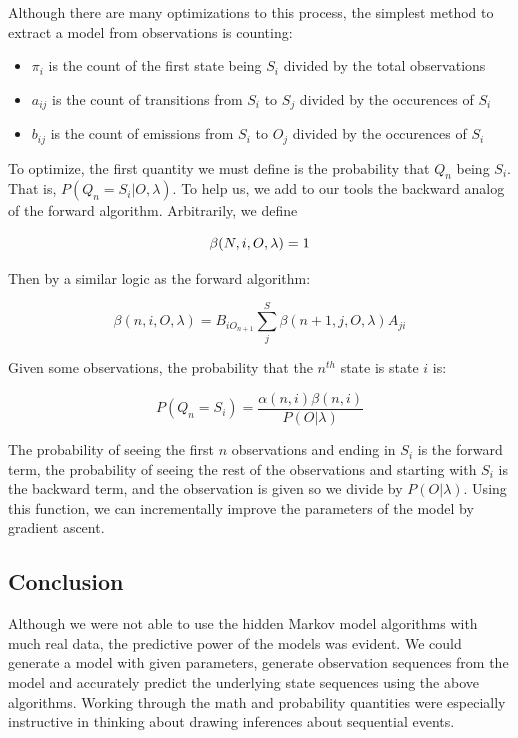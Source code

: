 \documentclass[11pt,a4paper]{article}
\begin{document}
Although there are many optimizations to this process, the simplest method to extract a model from observations is counting:
\begin{itemize}
\item $\pi_i$ is the count of the first state being $S_i$ divided by the total observations
\item $a_{ij}$ is the count of transitions from $S_i$ to $S_j$ divided by the occurences of $S_i$
\item $b_{ij}$ is the count of emissions from $S_i$ to $O_j$ divided by the occurences of $S_i$
\end{itemize}

To optimize, the first quantity we must define is the probability that $Q_n$ being $S_i$. That is, $P(Q_n = S_i | O, \lambda)$. To help us, we add to our tools the backward analog of the forward algorithm. Arbitrarily, we define

\[
\beta(N, i, O, \lambda) = 1 \\
\]

Then by a similar logic as the forward algorithm:

\[
\beta(n, i, O, \lambda) = B_{iO_{n+1}} \sum_j^S{\beta(n+1, j, O, \lambda)A_{ji}}
\]

Given some observations, the probability that the $n^{th}$ state is state $i$ is:

\[
P(Q_n = S_i) = \frac{\alpha(n, i) \beta(n, i)}{P(O|\lambda)}
\]

The probability of seeing the first $n$ observations and ending in $S_i$ is the forward term, the probability of seeing the rest of the observations and starting with $S_i$ is the backward term, and the observation is given so we divide by $P(O|\lambda)$. Using this function, we can incrementally improve the parameters of the model by gradient ascent.

\subsection{Conclusion}
\label{Hidden Markov Models:Conclusion}

Although we were not able to use the hidden Markov model algorithms with much real data, the predictive power of the models was evident. We could generate a model with given parameters, generate observation sequences from the model and accurately predict the underlying state sequences using the above algorithms. Working through the math and probability quantities were especially instructive in thinking about drawing inferences about sequential events.
\end{document}
